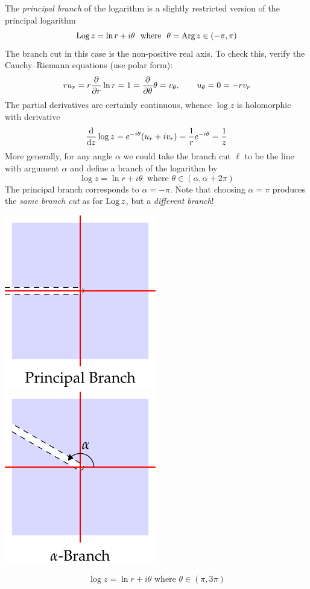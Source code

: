 \begin{minipage}[t]{0.71\linewidth}\vspace{0pt}
The \emph{principal branch} of the logarithm is a slightly restricted version of the principal logarithm
\[\operatorname{Log} z=\ln r+i\theta\ \text{ where }\ \theta=\operatorname{Arg} z\in(-\pi,\pi)\]
The branch cut in this case is the non-positive real axis. To check this, verify the Cauchy--Riemann equations (use polar form\footnotemark):
\[ru_r=r\frac{\partial }{\partial r}\ln r=1=\frac{\partial }{\partial \theta}\theta=v_\theta,\qquad u_\theta=0=-rv_r\]
The partial derivatives are certainly continuous, whence $\log z$ is holomorphic with derivative 
\[\frac{\mathrm{d} }{\mathrm{d} z}\log z=e^{-i\theta}(u_r+iv_r)=\frac 1re^{-i\theta}=\frac 1z\]
More generally, for any angle $\alpha$ we could take the branch cut $\ell$ to be the line with argument $\alpha$ and define a branch of the logarithm by
\[\log z=\ln r+i\theta \ \text{ where } \theta\in (\alpha,\alpha+2\pi)\]
The principal branch corresponds to $\alpha=-\pi$. Note that choosing $\alpha=\pi$ produces the \emph{same branch cut} as for $\operatorname{Log} z$, but a \emph{different branch}!
\end{minipage}\begin{minipage}[t]{0.29\linewidth}\vspace{0pt}
\flushright\includegraphics{branch1}\\
\includegraphics{branch2}
\end{minipage}
\[\log z=\ln r+i\theta\text{ where }\theta\in(\pi,3\pi)\]

